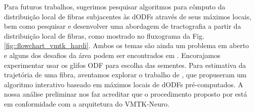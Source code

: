 \documentclass[
    12pt,                %
    oneside,            %
    a4paper,            %
    english,            %
    french,                %
    spanish,            %
    brazil                %
    ]{abntex2}
\begin{document}





Para futuros trabalhos, sugerimos pesquisar algoritmos para cômputo da distribuição local de fibras subjacentes às dODFs através de seus máximos locais, bem como pesquisar e desenvolver uma abordagem de tractografia a partir da distribuição local de fibras, como mostrado no fluxograma da Fig. \ref{fig::flowchart_vmtk_hardi}.
Ambos os temas são ainda um problema em aberto e alguns dos desafios da área podem ser encontrados em .
Encorajamos experimentar usar os glifos ODF para escolha das sementes. 
Para estimativa da trajetória de uma fibra, aventamos explorar o trabalho de , que propuseram um algoritmo interativo baseado em máximos locais de dODFs pré-computados. A nossa análise preliminar nos faz acreditar que o procedimento proposto por  está em conformidade com a arquitetura do VMTK-Neuro.


\end{document}
